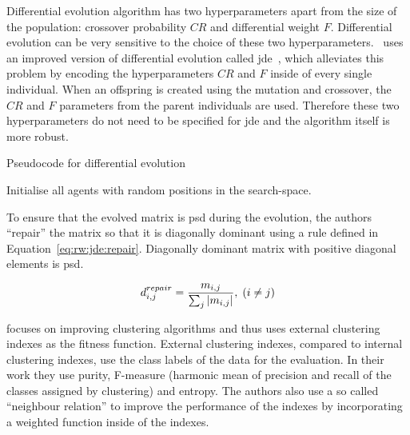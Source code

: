 Differential evolution algorithm has two hyperparameters apart from the size of the population: crossover probability $CR$ and differential weight $F$. Differential evolution can be very sensitive to the choice of these two hyperparameters.~\citep{fukui2013evolutionary} uses an improved version of differential evolution called \acf{jde}~\citep{brest2006self}, which alleviates this problem by encoding the hyperparameters $CR$ and $F$ inside of every single individual. When an offspring is created using the mutation and crossover, the $CR$ and $F$ parameters from the parent individuals are used. Therefore these two hyperparameters do not need to be specified for \ac{jde} and the algorithm itself is more robust.

\begin{algorithm}[t]
\caption{Pseudocode for differential evolution} \label{pseudo:de}
\DontPrintSemicolon
\LinesNumbered
{}
Initialise all agents with random positions in the search-space.\;
\end{algorithm} 

To ensure that the evolved matrix is \ac{psd} during the evolution, the authors ``repair'' the matrix so that it is diagonally dominant using a rule defined in Equation~\ref{eq:rw:jde:repair}. Diagonally dominant matrix with positive diagonal elements is \ac{psd}.

\begin{equation}
d_{i,j}^{repair} = \frac{m_{i,j}}{\sum_j \left|{m_{i,j}}\right|}, \; (i \neq j)
\label{eq:rw:jde:repair}
\end{equation}

\citep{fukui2013evolutionary} focuses on improving clustering algorithms and thus uses external clustering indexes as the fitness function. External clustering indexes, compared to internal clustering indexes, use the class labels of the data for the evaluation. In their work they use purity, \mbox{F-measure} (harmonic mean of precision and recall of the classes assigned by clustering) and entropy. The authors also use a so called ``neighbour relation'' to improve the performance of the indexes by incorporating a weighted function inside of the indexes. 

